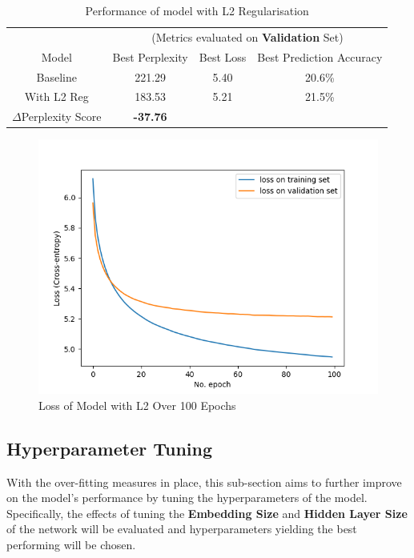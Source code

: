 \documentclass[sigconf,nonacm=true]{acmart}
\begin{document}
\begin{table}[H]
	\label{tab:regbasecomp}
	\begin{adjustbox}{width=\columnwidth}
		\begin{tabular}{cccc}
			\toprule
			&\multicolumn{3}{c}{(Metrics evaluated on \textbf{Validation} Set)}\\
			Model &Best Perplexity&Best Loss&Best Prediction Accuracy\\
			\midrule
			Baseline & 221.29 & 5.40 & 20.6\% \\
			With L2 Reg & 183.53 & 5.21 & 21.5\% \\
			\midrule
			$\Delta$Perplexity Score & \textbf{-37.76}\\
			\bottomrule
		\end{tabular}
	\end{adjustbox}
	\caption{Performance of model with L2 Regularisation}
\end{table}

\begin{figure}[H]
	\centering
	\includegraphics[scale=0.47]{figures/l2_loss.png}
	\caption{Loss of Model with L2 Over 100 Epochs}
	\label{fig:l2loss}
\end{figure}


\subsection{Hyperparameter Tuning}
With the over-fitting measures in place, this sub-section aims to further improve on the model's performance by tuning the hyperparameters of the model. Specifically, the effects of tuning the  \textbf{Embedding Size} and \textbf{Hidden Layer Size} of the network will be evaluated and hyperparameters yielding the best performing will be chosen.
\end{document}

